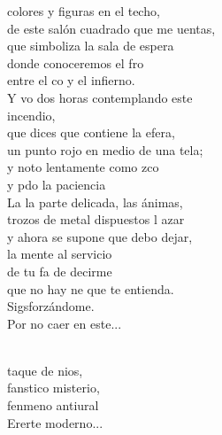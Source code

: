 \documentclass[12pt]{article}
\begin{document}
 
    \sffamily

    \begin{multicols*}{2}
        
        \begin{cancion}%
                 colores y figuras en el techo,\\
                de este salón cuadrado que me uentas,\\
        que simboliza la sala de espera\\
                donde conoceremos el fro \\
                entre el co y el infierno.\\
        \jump
                Y vo dos horas contemplando este \\
        incendio,\\
                que dices que contiene la efera,\\
        un punto rojo en medio de una tela;\\
                y noto lentamente como zco \\
                y pdo la paciencia\\
        \jump
                La la parte delicada, las ánimas,\\
                trozos de metal dispuestos l azar\\
        y ahora se supone que debo dejar,\\
        la mente al servicio\\
                de tu fa de decirme\\
                que no hay ne que te entienda.\\
        \jump
                Sigsforzándome.\\
        Por no caer en este...\\\jump\\
                \begin{chorus}%
                taque de nios,\\
                fanstico misterio, \\
                fenmeno antiural \\
                Ererte moderno...\\

\end{chorus}
\end{cancion}
\end{multicols*}
\end{document}

